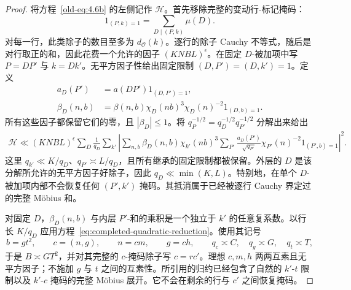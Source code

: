 \begin{proof}
将方程~\eqref{old-eq:4.6b} 的左侧记作 \(\mathcal H\)。首先移除完整的变动行-标记掩码：
\[
 1_{(P,k)=1}=\sum_{D\mid(P,k)}\mu(D).
\]
对每一行，此类除子的数目至多为 \(d_{\mathcal O}(k)\)。逐行的除子 Cauchy 不等式，随后是对行取正的和，因此花费一个允许的因子 \((KNBL)^\epsilon\)。在固定 \(D\)-被加项中写 \(P=DP'\) 与 \(k=Dk'\)。无平方因子性给出固定限制 \((D,P')=(D,k')=1\)。定义
\[
 \begin{split}
 a_D(P')&=a(DP')1_{(D,P')=1},\\
 \beta_D(n,b)&=\beta(n,b)\chi_D(nb)^3\chi_D(n)^{-2}1_{(D,b)=1}.
 \end{split}
\]
所有这些因子都保留它们的零，且 \(|\beta_D|\le1\)。将 \(q_P^{-1/2}=q_D^{-1/2}q_{P'}^{-1/2}\) 分解出来给出
\begin{equation}\label{eq:hybrid-mark-mask-reduction}
 \begin{split}
 \mathcal H\ll (KNBL)^\epsilon\sum_D\frac1{q_D}
 \sum_{k'}\left|
 \sum_{n,b}\beta_D(n,b)\chi_{k'}(nb)^3
 \sum_{P'}\frac{a_D(P')}{\sqrt{q_{P'}}}
       \chi_{P'}(n)^{-2}1_{(P',b)=1}
 \right|^2.
 \end{split}
\end{equation}
这里 \(q_{k'}\ll K/q_D\)、\(q_{P'}\asymp L/q_D\)，且所有继承的固定限制都被保留。外层的 \(D\) 是该分解所允许的无平方因子好除子，因此 \(q_D\ll\min(K,L)\)。特别地，在单个 \(D\)-被加项内部不会恢复任何 \((P',k')\) 掩码。其抵消属于已经被逐行 Cauchy 界定过的完整 M\"obius 和。

对固定 \(D\)，\(\beta_D(n,b)\) 与内层 \(P'\)-和的乘积是一个独立于 \(k'\) 的任意复系数。以行长 \(K/q_D\) 应用方程~\eqref{eq:completed-quadratic-reduction}。使用其记号
\[
 b=gt^2,\qquad c=(n,g),\qquad n=cm,\qquad g=ch,
 \qquad q_c\asymp C,\quad q_g\asymp G,\quad q_t\asymp T,
\]
于是 \(B\asymp GT^2\)，并对其完整的 \(c\)-掩码除子写 \(c=rc'\)。理想 \(c,m,h\) 两两互素且无平方因子；不施加 \(g\) 与 \(t\) 之间的互素性。所引用的归约已经包含了自然的 \(k'\)-\(t\) 限制以及 \(k'\)-\(c\) 掩码的完整 M\"obius 展开。它不会在剩余的行与 \(c'\) 之间恢复掩码。


\end{proof}

